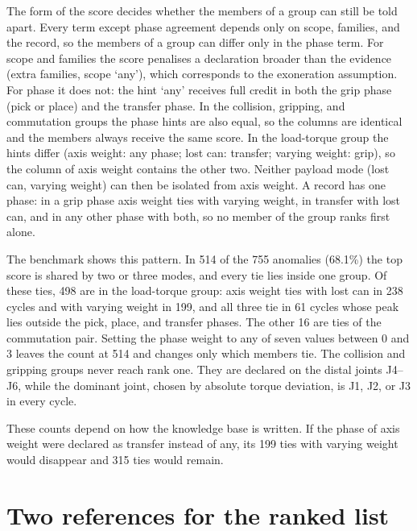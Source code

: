 \documentclass{ifacconf}
\begin{document}
The form of the score decides whether the members of a group can still be told
apart. Every term except phase agreement depends only on scope, families, and
the record, so the members of a group can differ only in the phase term. For
scope and families the score penalises a declaration broader than the evidence
(extra families, scope `any'), which corresponds to the exoneration assumption.
For phase it does not: the hint `any' receives full credit in both the grip
phase (pick or place) and the transfer phase. In the collision, gripping, and
commutation groups the phase hints are also equal, so the columns are identical
and the members always receive the same score. In the load-torque group the
hints differ (axis weight: any phase; lost can: transfer; varying weight: grip),
so the column of axis weight contains the other two. Neither payload mode (lost
can, varying weight) can then be isolated from axis weight. A record has one
phase: in a grip phase axis weight ties with varying weight, in transfer with
lost can, and in any other phase with both, so no member of the group ranks
first alone.

The benchmark shows this pattern. In 514 of the 755 anomalies (68.1\%) the top
score is shared by two or three modes, and every tie lies inside one group. Of
these ties, 498 are in the load-torque group: axis weight ties with lost can in
238 cycles and with varying weight in 199, and all three tie in 61 cycles whose
peak lies outside the pick, place, and transfer phases. The other 16 are ties of
the commutation pair. Setting the phase weight to any of seven values between 0
and 3 leaves the count at 514 and changes only which members tie. The collision
and gripping groups never reach rank one. They are declared on the distal joints
J4--J6, while the dominant joint, chosen by absolute torque deviation, is J1, J2,
or J3 in every cycle.

These counts depend on how the knowledge base is written. If the phase of axis
weight were declared as transfer instead of any, its 199 ties with varying
weight would disappear and 315 ties would remain.

\section{Two references for the ranked list}
\label{sec:baselines}
\end{document}
